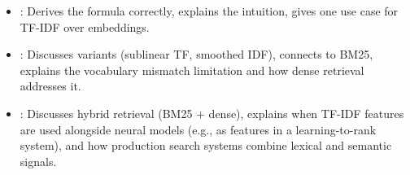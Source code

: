 \begin{interviewq}

\goodgreat
\begin{itemize}
    \item {}: Derives the formula correctly, explains the intuition, gives
    one use case for TF-IDF over embeddings.
    \item {}: Discusses variants (sublinear TF, smoothed IDF), connects to BM25,
    explains the vocabulary mismatch limitation and how dense retrieval addresses it.
    \item {}: Discusses hybrid retrieval (BM25 + dense), explains when
    TF-IDF features are used alongside neural models (e.g., as features in a learning-to-rank
    system), and how production search systems combine lexical and semantic signals.
\end{itemize}

\end{interviewq}

\vspace{0.5em}

